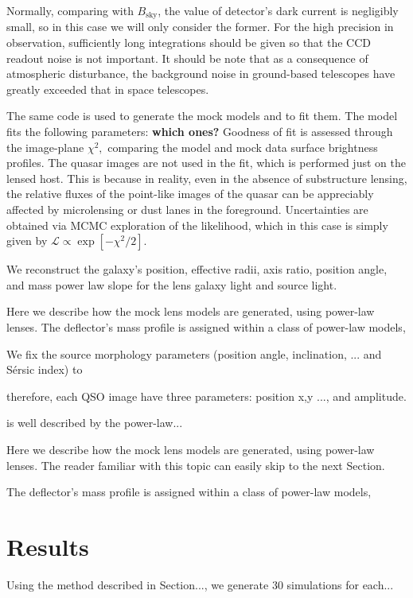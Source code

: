 \documentclass[a4paper,11pt]{article}
\begin{document}
Normally, comparing with $B_{\mathrm{sky}}$, the value of detector's dark current is negligibly small, so in this case we will only consider the former. For the high precision in observation, sufficiently long integrations should be given so that the CCD readout noise is not important. It should be note that as a consequence of atmospheric disturbance, the background noise in ground-based telescopes have greatly exceeded that in space telescopes.


The same code is used to generate the mock models and to fit them. The model fits the following parameters: \textbf{which ones?}  Goodness of fit is assessed through the image-plane $\chi^{2},$ comparing the model and mock data surface brightness profiles. The quasar images are not used in the fit, which is performed just on the lensed host. This is because in reality, even in the absence of substructure lensing, the relative fluxes of the point-like images of the quasar can be appreciably affected by microlensing or dust lanes in the foreground. Uncertainties are obtained via MCMC exploration of the likelihood, which in this case is simply given by $\mathcal{L}\propto\exp[-\chi^{2}/2].$

We reconstruct the galaxy's position, effective radii, axis ratio, position angle, and mass power law slope for the lens galaxy light and source light. 



Here we describe how the mock lens models are generated, using power-law lenses. The deflector’s mass profile is assigned within a class of power-law models,

We fix the source morphology parameters (position angle, inclination, ... and S\'ersic index) to

therefore, each QSO image have three parameters: position x,y ..., and amplitude. 

is well described by the power-law...

Here we describe how the mock lens models are generated, using power-law lenses. The reader familiar with this topic can easily skip to the next Section.

The deflector's mass profile is assigned within a class of power-law models,


\section{Results}

Using the method described in Section..., we generate 30 simulations for each...
\end{document}
